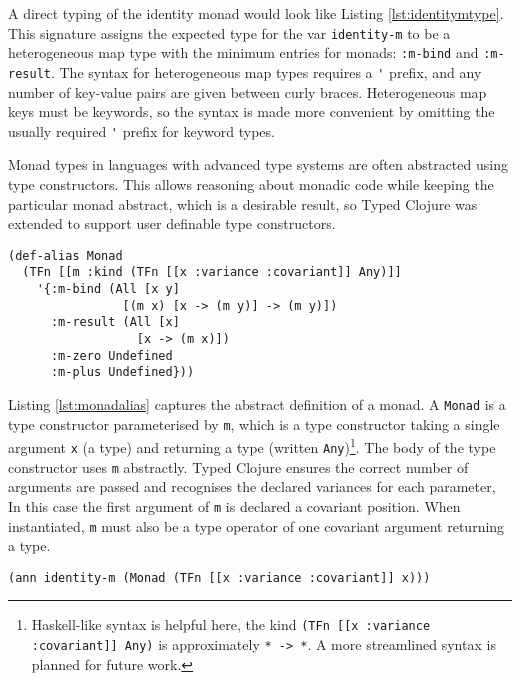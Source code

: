 A direct typing of the identity monad would look like Listing \ref{lst:identitymtype}.
This signature assigns the expected type for the var \lstinline|identity-m| 
to be a heterogeneous map type with the minimum entries for monads: \lstinline|:m-bind|
and \lstinline|:m-result|. The syntax for heterogeneous map types requires a \lstinline|'| prefix,
and any number of key-value pairs are given between curly braces. Heterogeneous map keys must be keywords,
so the syntax is made more convenient by omitting the usually required \lstinline|'| prefix
for keyword types.

Monad types in languages with advanced type systems are often abstracted using type constructors.
This allows reasoning about monadic code while keeping the particular monad abstract, which is a desirable result,
so Typed Clojure was extended to support user definable type constructors.

\begin{lstlisting}[caption=An abstract definition of a monad., label=lst:monadalias]
(def-alias Monad 
  (TFn [[m :kind (TFn [[x :variance :covariant]] Any)]]
    '{:m-bind (All [x y]
                [(m x) [x -> (m y)] -> (m y)])
      :m-result (All [x]
                  [x -> (m x)])
      :m-zero Undefined
      :m-plus Undefined}))
\end{lstlisting}

Listing \ref{lst:monadalias} captures the abstract definition of a monad.
A \lstinline|Monad| is a type constructor parameterised by \lstinline|m|, which is
a type constructor taking a single argument \lstinline|x| (a type) and returning a type 
(written \lstinline|Any|)\footnote{Haskell-like syntax is helpful here, the kind \lstinline|(TFn [[x :variance :covariant]] Any)|
is approximately \lstinline|* -> *|. A more streamlined syntax is planned for future work.}.
The body of the type constructor uses \lstinline|m| abstractly. Typed Clojure
ensures the correct number of arguments are passed and recognises the declared variances
for each parameter, In this case the first argument of \lstinline|m| is declared
a covariant position. When instantiated, \lstinline|m| must also be a type operator
of one covariant argument returning a type.

\begin{lstlisting}[caption=Identity monad using user defined type constructors, label=lst:identityctors]
(ann identity-m (Monad (TFn [[x :variance :covariant]] x)))
\end{lstlisting}

